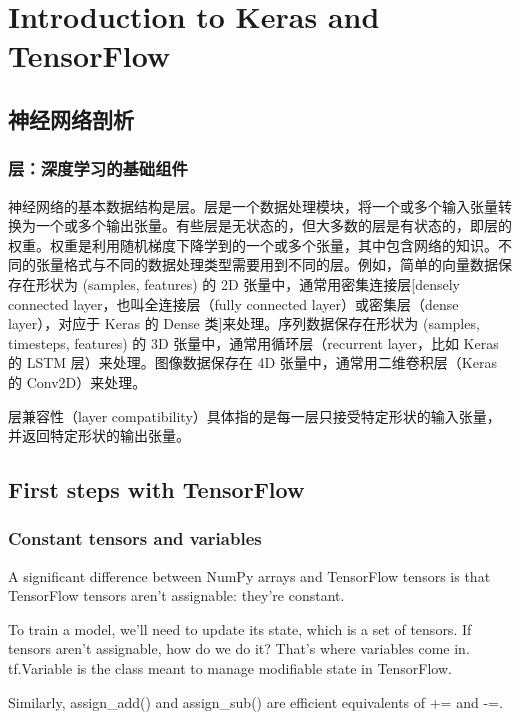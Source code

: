 \chapter{Introduction to Keras and TensorFlow\label{Ch03}}

\section{神经网络剖析}

\subsection{层：深度学习的基础组件}
神经网络的基本数据结构是层。层是一个数据处理模块，将一个或多个输入张量转换为一个或多个输出张量。有些层是无状态的，但大多数的层是有状态的，即层的权重。权重是利用随机梯度下降学到的一个或多个张量，其中包含网络的知识。不同的张量格式与不同的数据处理类型需要用到不同的层。例如，简单的向量数据保存在形状为 (samples, features) 的 2D 张量中，通常用密集连接层[densely connected layer，也叫全连接层（fully connected layer）或密集层（dense layer），对应于 Keras 的 Dense 类]来处理。序列数据保存在形状为 (samples, timesteps, features) 的 3D 张量中，通常用循环层（recurrent layer，比如 Keras 的 LSTM 层）来处理。图像数据保存在 4D 张量中，通常用二维卷积层（Keras 的 Conv2D）来处理。

层兼容性（layer compatibility）具体指的是每一层只接受特定形状的输入张量，并返回特定形状的输出张量。


\section{First steps with TensorFlow}
\subsection{Constant tensors and variables}
A significant difference between NumPy arrays and TensorFlow tensors is that TensorFlow tensors aren't assignable: they're constant.

To train a model, we'll need to update its state, which is a set of tensors. If tensors aren't assignable, how do we do it? That's where variables come in. \textsf{tf.Variable} is the class meant to manage modifiable state in TensorFlow.

Similarly, assign\_add() and assign\_sub() are efficient equivalents of += and -=.

